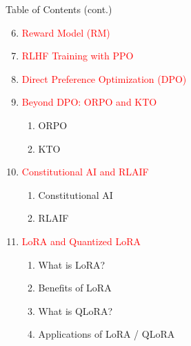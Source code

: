 \begin{frame}[t]{Table of Contents (cont.)}
  \scriptsize
  \begin{enumerate}
    \setcounter{enumi}{5}
    \item \textcolor{red}{Reward Model (RM)}
    \item \textcolor{red}{RLHF Training with PPO}
    \item \textcolor{red}{Direct Preference Optimization (DPO)}
    \item \textcolor{red}{Beyond DPO: ORPO and KTO}
      \begin{enumerate}
        \scriptsize
        \item ORPO
        \item KTO
      \end{enumerate}
    \item \textcolor{red}{Constitutional AI and RLAIF}
      \begin{enumerate}
        \scriptsize
        \item Constitutional AI
        \item RLAIF
      \end{enumerate}
    \item \textcolor{red}{LoRA and Quantized LoRA}
      \begin{enumerate}
        \scriptsize
        \item What is LoRA?
        \item Benefits of LoRA
        \item What is QLoRA?
        \item Applications of LoRA / QLoRA
      \end{enumerate}
  \end{enumerate}
\end{frame}

